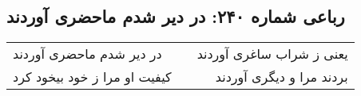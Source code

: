 \begin{center}
\section*{رباعی شماره ۲۴۰: در دیر شدم ماحضری آوردند}
\label{sec:sh240}
\begin{longtable}{l p{0.5cm} r}
در دیر شدم ماحضری آوردند
&&
یعنی ز شراب ساغری آوردند
\\
کیفیت او مرا ز خود بیخود کرد
&&
بردند مرا و دیگری آوردند
\\
\end{longtable}
\end{center}
